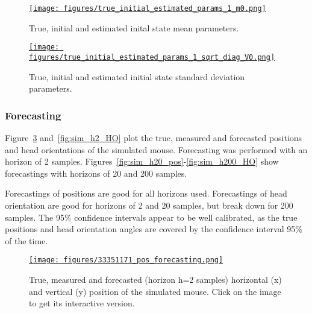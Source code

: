 \documentclass[12pt]{article}
\begin{document}
\begin{figure}
    \centering
    \href{https://www.gatsby.ucl.ac.uk/~rapela/aman/reports/ekfForKinematicsAndHeadOrientation/figures/true_initial_estimated_params_1_m0.png}{\texttt{[image: figures/true\_initial\_estimated\_params\_1\_m0.png]}}

    \caption{True, initial and estimated inital state mean parameters.}

    \label{fig:m0_params}
\end{figure}

\begin{figure}
    \centering
    \href{https://www.gatsby.ucl.ac.uk/~rapela/aman/reports/ekfForKinematicsAndHeadOrientation/figures/true_initial_estimated_params_1_sqrt_diag_V0.png}{\texttt{[image: figures/true\_initial\_estimated\_params\_1\_sqrt\_diag\_V0.png]}}

    \caption{True, initial and estimated initial state standard deviation parameters.}

    \label{fig:sqrt_diag_V0_params}
\end{figure}

\subsubsection*{Forecasting}

Figure~\ref{fig:sim_h2_pos} and~\ref{fig:sim_h2_HO} plot the true, measured and forecasted positions
and head orientations of the simulated mouse. Forecasting was performed with an horizon of 2 samples.
%
Figures~\ref{fig:sim_h20_pos}-\ref{fig:sim_h200_HO} show forecastings with horizons of 20 and 200 samples.

Forecastings of positions are good for all horizons used. Forecastings of head
orientation are good for horizons of 2 and 20 samples, but break down for 200
samples.
%
The 95\% confidence intervals appear to be well calibrated, as the true
positions and head orientation angles are covered by the confidence interval
95\% of the time.

\begin{figure}
    \centering
    \href{https://www.gatsby.ucl.ac.uk/~rapela/aman/reports/ekfForKinematicsAndHeadOrientation/figures/33351171_pos_forecasting.html}{\texttt{[image: figures/33351171\_pos\_forecasting.png]}}
    \caption{True, measured and forecasted (horizon h=2 samples) horizontal (x) and vertical (y)
    position of the simulated mouse. Click on the image to get its
    interactive version.}
    \label{fig:sim_h2_pos}
\end{figure}
\end{document}
